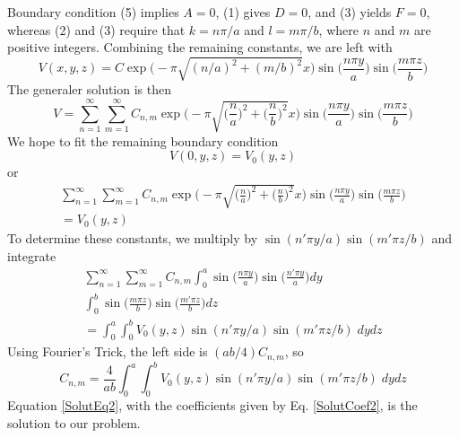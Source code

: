 \documentclass[../../../main.tex]{subfiles}
\begin{document}
Boundary condition (5) implies $A = 0$, (1) gives $D = 0$, and (3) yields $F = 0$, whereas (2) and (3) require that $k = n\pi/a$ and $l = m\pi/b$, where $n$ and $m$ are positive integers. Combining the remaining constants, we are left with
\begin{equation*}
    V(x,y,z)=C\exp\biggl(-\pi\sqrt{(n/a)^2+(m/b)^2} x\biggr) \sin\biggl(\frac{n\pi y}{a}\biggr) \sin\biggl(\frac{m\pi z}{b}\biggr)
\end{equation*}
The generaler solution is then
\begin{equation}\label{SolutEq2}
    V=\sum_{n=1}^{\infty}\sum_{m=1}^{\infty}C_{n,m}\exp\biggl(-\pi\sqrt{\big(\frac{n}{a}\big)^2+\big(\frac{n}{b}\big)^2} x\biggr) \sin\biggl(\frac{n\pi y}{a}\biggr) \sin\biggl(\frac{m\pi z}{b}\biggr)
\end{equation}
We hope to ﬁt the remaining boundary condition
\begin{equation*}
    V(0,y,z)=V_0(y,z)
\end{equation*}
or 
\begin{multline*}
    \sum_{n=1}^{\infty}\sum_{m=1}^{\infty}C_{n,m}\exp\biggl(-\pi\sqrt{\big(\frac{n}{a}\big)^2+\big(\frac{n}{b}\big)^2}x\biggr) \sin\biggl(\frac{n\pi y}{a}\biggr) \sin\biggl(\frac{m\pi z}{b}\biggr)\\=V_0(y,z)
\end{multline*}
To determine these constants, we multiply by $\sin(n'\pi y/a) \sin(m'\pi z/b)$ and integrate
\begin{multline*}
    \sum_{n=1}^{\infty}\sum_{m=1}^{\infty}C_{n,m} \int_{0}^{a}\sin\biggl(\frac{n\pi y}{a}\biggr) \sin\biggl(\frac{n'\pi y}{a}\biggr) dy \\\int_{0}^{b} \sin\biggl(\frac{m\pi z}{b}\biggr)\sin\biggl(\frac{m'\pi z}{b}\biggr)dz\\
    =\int_{0}^{a}\int_{0}^{b}V_0(y,z)\sin(n'\pi y/a) \sin(m'\pi z/b)\;dydz
\end{multline*}
Using Fourier's Trick, the left side is $(ab/4)C_{n,m} $, so
\begin{equation}\label{SolutCoef2}
    C_{n,m}=\frac{4}{ab}\int_{0}^{a}\int_{0}^{b}V_0(y,z)\sin(n'\pi y/a) \sin(m'\pi z/b)\;dydz
\end{equation}
Equation \ref{SolutEq2}, with the coefficients given by Eq. \ref{SolutCoef2}, is the solution to our problem.
\end{document}
